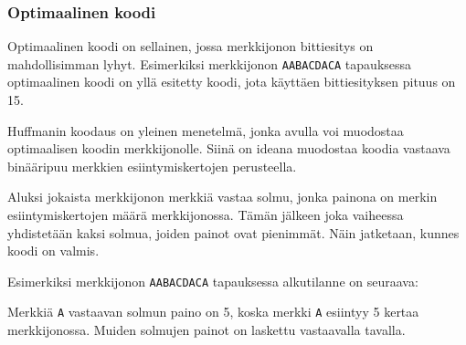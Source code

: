 \subsubsection{Optimaalinen koodi}

Optimaalinen koodi on sellainen, jossa merkkijonon bittiesitys
on mahdollisimman lyhyt.
Esimerkiksi merkkijonon \texttt{AABACDACA} tapauksessa
optimaalinen koodi on yllä esitetty koodi,
jota käyttäen bittiesityksen pituus on 15.

Huffmanin koodaus on yleinen menetelmä,
jonka avulla voi muodostaa optimaalisen koodin merkkijonolle.
Siinä on ideana muodostaa koodia vastaava binääripuu
merkkien esiintymiskertojen perusteella.

Aluksi jokaista merkkijonon merkkiä vastaa solmu,
jonka painona on merkin esiintymiskertojen määrä merkkijonossa.
Tämän jälkeen joka vaiheessa yhdistetään kaksi solmua,
joiden painot ovat pienimmät.
Näin jatketaan, kunnes koodi on valmis.

Esimerkiksi merkkijonon \texttt{AABACDACA} tapauksessa
alkutilanne on seuraava:

\begin{center}
\end{center}
Merkkiä \texttt{A} vastaavan solmun paino on
5, koska merkki \texttt{A} esiintyy 5 kertaa merkkijonossa.
Muiden solmujen painot on laskettu vastaavalla tavalla.

